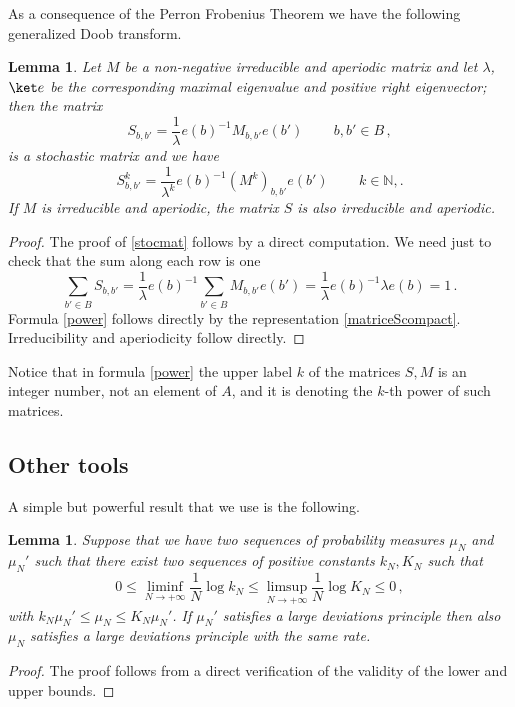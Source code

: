 \documentclass[reqno]{amsart}
\theoremstyle{plain}
\newtheorem{lemma}[theorem]{Lemma}
\theoremstyle{definition}
\theoremstyle{remark}
\numberwithin{equation}{section}
\numberwithin{theorem}{section}
\newcommand{\<}{\langle}
\renewcommand{\>}{\rangle}
\begin{document}
	As a consequence of the Perron Frobenius Theorem we have the following generalized Doob transform.
	\begin{lemma}\label{stoclemma}
		Let $M$ be a non-negative irreducible and aperiodic matrix and let $\lambda$, $\ket e$ be the corresponding maximal eigenvalue and positive right eigenvector; then the matrix
		\begin{equation}\label{stocmat}
			S_{b,b'}=\frac 1\lambda e(b)^{-1} M_{b,b'}e(b')\, \qquad b,b'\in B\,,
		\end{equation}
		is a stochastic matrix and we have
		\begin{equation}\label{power}
			S^{k}_{b,b'}=\frac {1}{\lambda^k} e(b)^{-1}  \left(M^{k}\right)_{b,b'} e(b') \, \qquad  k\in \mathbb N,.
		\end{equation}
		If $M$ is irreducible and aperiodic, the matrix $S$ is also irreducible and aperiodic.
	\end{lemma}
	\begin{proof}
		The proof of \eqref{stocmat} follows by a direct computation. We need just to check that the sum along each row is one
		$$
		\sum_{b'\in B} S_{b,b'}=\frac{1}{\lambda}  e(b)^{-1}\sum_{b'\in B} M_{b,b'} e(b')=\frac 1\lambda e(b)^{-1}\lambda e(b)=1\,.
		$$
		Formula \eqref{power} follows directly by the representation \eqref{matriceScompact}. Irreducibility and aperiodicity follow directly.
	\end{proof}
	Notice that in formula \eqref{power} the upper label $k$ of the matrices $S,M$ is an integer number, not an element of $A$, and it is denoting the $k$-th power of such matrices.
	
	
	
	
	\subsection{Other tools}
	A simple but powerful result that we use is the following.
	\begin{lemma}\label{lemmac}
		Suppose that we have two sequences of probability measures $\mu_N$ and $\mu_{N}'$ such that there exist two sequences of positive constants $k_N,K_N$ such that
		\begin{equation}
			0\leq \liminf_{N\to +\infty}\frac 1N\log k_N\leq \limsup_{N\to +\infty} \frac 1N\log K_N\leq 0\,, 
		\end{equation}
		with $k_N\mu_N'\leq \mu_N\leq K_N\mu_N'$. If $\mu_N'$ satisfies a large deviations principle then also $\mu_N$ satisfies a large deviations principle with the same rate.
	\end{lemma}
	\begin{proof}
		The proof follows from a direct verification of the validity of the lower and upper bounds.
	\end{proof}
	
\end{document}
